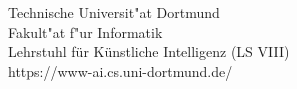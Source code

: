 \begin{titlepage}
\vspace*{2.5cm}
\hspace*{\links}
\begin{minipage}[b]{8cm}
\raggedright
Technische Universit"at Dortmund \\
Fakult"at f"ur Informatik\\
Lehrstuhl für Künstliche Intelligenz (LS VIII)\\
https://www-ai.cs.uni-dortmund.de/
\end{minipage}
\begin{minipage}[b]{8cm}
\raggedleft
\end{minipage}

\end{titlepage}
